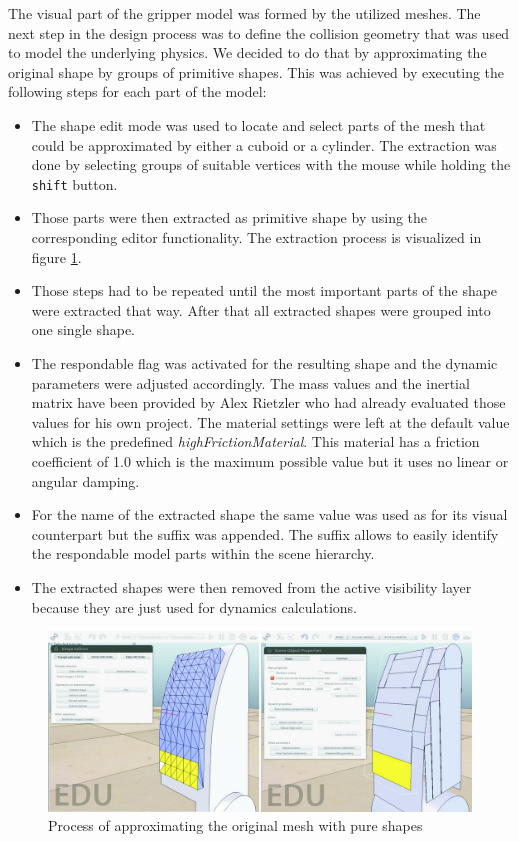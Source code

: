 The visual part of the gripper model was formed by the utilized meshes. The next step in the design process was to define the collision geometry that was used to model the underlying physics. We decided to do that by approximating the original shape by groups of primitive shapes. This was achieved by executing the following steps for each part of the model:
\begin{itemize}
\item
The shape edit mode was used to locate and select parts of the mesh that could be approximated by either a cuboid or a cylinder. The extraction was done by selecting groups of suitable vertices with the mouse while holding the \texttt{shift} button.
\item
Those parts were then extracted as primitive shape by using the corresponding editor functionality.
The extraction process is visualized in figure \ref{fig:ex_pure_shape}.
\item
Those steps had to be repeated until the most important parts of the shape were extracted that way. After that all extracted shapes were grouped into one single shape.
\item
The respondable flag was activated for the resulting shape and the dynamic parameters were adjusted accordingly. The mass values and the inertial matrix have been provided by Alex Rietzler who had already evaluated those values for his own project. The material settings were left at the default value which is the predefined \emph{highFrictionMaterial}. This material has a friction coefficient of 1.0 which is the maximum possible value but it uses no linear or angular damping.
\item
For the name of the extracted shape the same value was used as for its visual counterpart but the  suffix was appended. The suffix allows to easily identify the respondable model parts within the scene hierarchy. 

\item
The extracted shapes were then removed from the active visibility layer because they are just used for dynamics calculations.
\end{itemize}

\begin{figure}
	\centering
  	\includegraphics[width=1.0\textwidth]{images/extract_pure_shapes.jpg}
	\caption{Process of approximating the original mesh with pure shapes}
	\label{fig:ex_pure_shape}
\end{figure}

